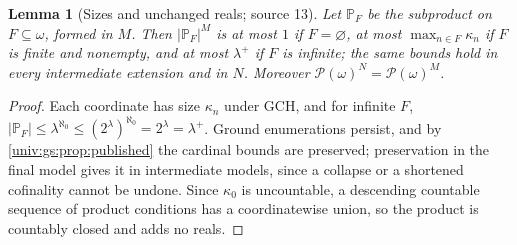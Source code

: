 \documentclass[11pt,letterpaper]{article}
\numberwithin{equation}{section}
\newtheorem{lemma}[lemma]{Lemma}
\theoremstyle{definition}
\theoremstyle{remark}
\newcommand{\Pow}{\mathcal P}
\newcommand{\abs}[1]{\lvert#1\rvert}
\begin{document}
\begin{lemma}[Sizes and unchanged reals; source 13]\label{univ:gs:lem:sizes}
Let $\mathbb P_F$ be the subproduct on $F\subseteq\omega$, formed in $M$. Then
$\abs{\mathbb P_F}^M$ is at most $1$ if $F=\varnothing$, at most $\max_{n\in F}\kappa_n$ if
$F$ is finite and nonempty, and at most $\lambda^+$ if $F$ is infinite; the same bounds
hold in every intermediate extension and in $N$. Moreover $\Pow(\omega)^N=\Pow(\omega)^M$.
\end{lemma}
\begin{proof}
Each coordinate has size $\kappa_n$ under GCH, and for infinite $F$,
$\abs{\mathbb P_F}\le\lambda^{\aleph_0}\le(2^\lambda)^{\aleph_0}=2^\lambda=\lambda^+$. Ground
enumerations persist, and by \cref{univ:gs:prop:published} the cardinal bounds are
preserved; preservation in the final model gives it in intermediate models, since a
collapse or a shortened cofinality cannot be undone. Since $\kappa_0$ is uncountable, a
descending countable sequence of product conditions has a coordinatewise union, so the
product is countably closed and adds no reals.
\end{proof}
\end{document}
